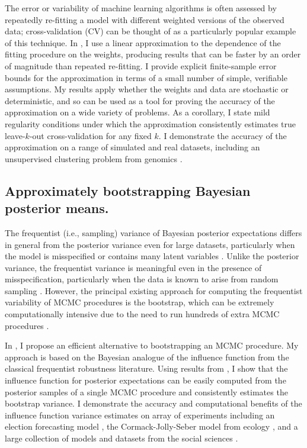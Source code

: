 The error or variability of machine learning algorithms is often assessed by
repeatedly re-fitting a model with different weighted versions of the observed
data; cross-validation (CV) can be thought of as a particularly popular example
of this technique.
%
In \citet{giordano:2019:ij}, I use a linear approximation to the dependence of
the fitting procedure on the weights, producing results that can be faster by an
order of magnitude than repeated re-fitting. I provide explicit finite-sample
error bounds for the approximation in terms of a small number of simple,
verifiable assumptions.  My results apply whether the weights and data are
stochastic or deterministic, and so can be used as a tool for proving the
accuracy of the approximation on a wide variety of problems. As a
corollary, I state mild regularity conditions under which the approximation
consistently estimates true leave-$k$-out cross-validation for any fixed $k$. I
demonstrate the accuracy of the approximation on a range of simulated and real
datasets, including an unsupervised clustering problem from genomics
\citep{Luan:2003:clustering, shoemaker:2015:ultrasensitive}.


\subsection*{Approximately bootstrapping Bayesian posterior means.}

The frequentist (i.e., sampling) variance of Bayesian posterior expectations
differs in general from the posterior variance even for large datasets,
particularly when the model is misspecified or contains many latent variables
\citep{kleijn:2006:misspecification}. Unlike the posterior variance, the
frequentist variance is meaningful even in the presence of misspecification,
particularly when the data is known to arise from random sampling
\citep{waddell:2002:bayesphyloboot}.  However, the principal existing approach
for computing the frequentist variability of MCMC procedures is the bootstrap,
which can be extremely computationally intensive due to the need to run hundreds
of extra MCMC procedures \citep{huggins:2019:bayesbag}.

In \citet{giordano:2020:stanconbayesij, giordano:2021:bayesij}, I propose an
efficient alternative to bootstrapping an MCMC procedure.  My approach is based
on the Bayesian analogue of the influence function from the classical
frequentist robustness literature.  Using results from
\citep{giordano:2018:covariances, giordano:2019:ij}, I show that the influence
function for posterior expectations can be easily computed from the posterior
samples of a single MCMC procedure and consistently estimates the bootstrap
variance. I demonstrate the accuracy and computational benefits of the influence
function variance estimates on array of experiments including an election
forecasting model \citep{economist:2020:election}, the Cormack-Jolly-Seber model
from ecology \citep{kery:2011:bayesian}, and a large collection of models and
datasets from the social sciences \citep{gelman:2006:arm}.

